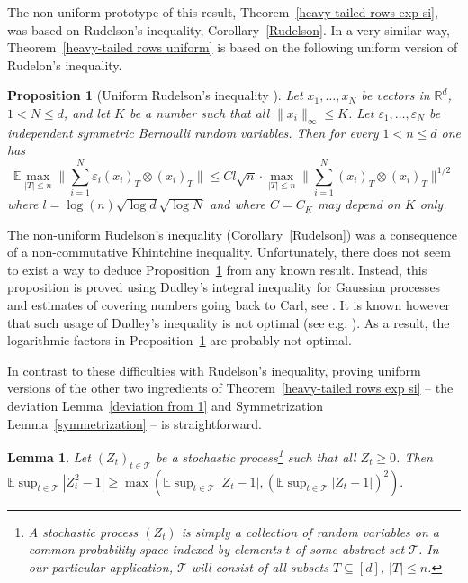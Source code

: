 \documentclass[10pt, openany]{book}
\newtheorem{proposition}[theorem]{Proposition}
\newtheorem{lemma}[theorem]{Lemma}
\theoremstyle{remark}
\def \R {\mathbb{R}}
\def \E {\mathbb{E}}
\def \TT {\mathcal{T}}
\def \e {\varepsilon}
\begin{document}
The non-uniform prototype of this result, 
Theorem~\ref{heavy-tailed rows exp si}, 
was based on Rudelson's inequality, Corollary~\ref{Rudelson}.
In a very similar way, Theorem~\ref{heavy-tailed rows uniform}
is based on the following uniform version of Rudelon's inequality.

\begin{proposition}[Uniform Rudelson's inequality \cite{RV Fourier}]	 	\label{RV Fourier}
  Let $x_1, \ldots, x_N$ be vectors in $\R^d$, $1 < N \le d$, 
  and let $K$ be a number such that
  all $\|x_i\|_\infty \le K$. 
  Let $\e_1, \ldots, \e_N$ be independent symmetric Bernoulli random variables. 
  Then for every $1 < n \le d$ one has
  $$
  \E \max_{|T| \le n} \Big\| \sum_{i=1}^N \e_i (x_i)_T \otimes (x_i)_T \Big\|
  \le C l \sqrt{n} \cdot \max_{|T| \le n} \Big\| \sum_{i=1}^N (x_i)_T \otimes (x_i)_T \Big\|^{1/2}
  $$ 
  where $l = \log(n) \sqrt{\log d} \sqrt{\log N}$
  and where $C = C_K$ may depend on $K$ only.
\end{proposition}

The non-uniform Rudelson's inequality (Corollary~\ref{Rudelson}) was a consequence of 
a non-commutative Khintchine inequality.
Unfortunately, there does not seem to exist a way to deduce Proposition~\ref{RV Fourier}
from any known result. 
Instead, this proposition is proved using Dudley's integral inequality for Gaussian processes and estimates
of covering numbers going back to Carl, see \cite{RV Fourier}. 
It is known however that such usage of Dudley's inequality is not optimal 
(see e.g. \cite{Ta book}). 
As a result, the logarithmic factors in Proposition~\ref{RV Fourier} are probably not optimal.
 
In contrast to these difficulties with Rudelson's inequality, proving uniform versions of 
the other two ingredients of Theorem~\ref{heavy-tailed rows exp si} --
the deviation Lemma~\ref{deviation from 1} and Symmetrization Lemma~\ref{symmetrization} --
is straightforward.

\begin{lemma}				\label{deviation from 1 uniform}
  Let $(Z_t)_{t \in \TT}$ be a stochastic process\footnote{A stochastic process $(Z_t)$ 
    is simply a collection of random variables 
    on a common probability space indexed by elements $t$ of some abstract set $\TT$.
    In our particular application, $\TT$ will consist of all subsets 
    $T \subseteq [d]$, $|T| \le n$.} 
  such that all $Z_t \ge 0$. Then 
  $
  \E \sup_{t \in \TT} |Z_t^2-1| \ge \max( \E \sup_{t \in \TT} |Z_t-1|, (\E \sup_{t \in \TT} |Z_t-1|)^2 ).
  $
\end{lemma}
\end{document}
